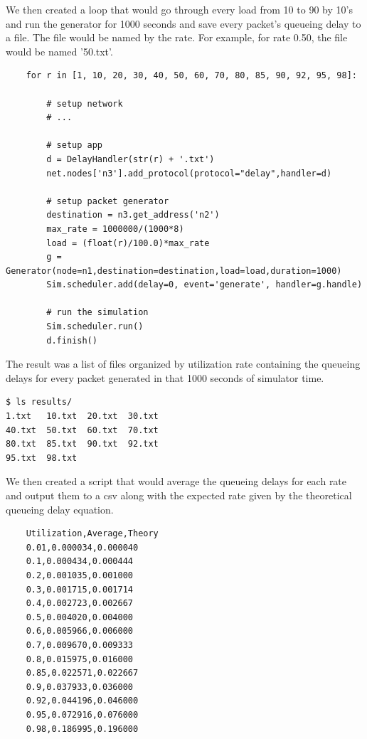 \documentclass[11pt]{article}
\begin{document}
\vspace{5mm}

We then created a loop that would go through every load from 10 to 90 by 10's and run the generator for 1000 seconds and save every packet's queueing delay to a file. The file would be named by the rate. For example, for rate 0.50, the file would be named '50.txt'.

\vspace{5mm}

\begin{lstlisting}
    for r in [1, 10, 20, 30, 40, 50, 60, 70, 80, 85, 90, 92, 95, 98]:

        # setup network
        # ...

        # setup app
        d = DelayHandler(str(r) + '.txt')
        net.nodes['n3'].add_protocol(protocol="delay",handler=d)

        # setup packet generator
        destination = n3.get_address('n2')
        max_rate = 1000000/(1000*8)
        load = (float(r)/100.0)*max_rate
        g = Generator(node=n1,destination=destination,load=load,duration=1000)
        Sim.scheduler.add(delay=0, event='generate', handler=g.handle)
        
        # run the simulation
        Sim.scheduler.run()
        d.finish()
\end{lstlisting}

\vspace{5mm}

The result was a list of files organized by utilization rate containing the queueing delays for every packet generated in that 1000 seconds of simulator time.

\vspace{5mm}

\begin{lstlisting}
$ ls results/
1.txt   10.txt  20.txt  30.txt  
40.txt  50.txt  60.txt  70.txt  
80.txt  85.txt  90.txt  92.txt  
95.txt  98.txt
\end{lstlisting}

\vspace{5mm}

We then created a script that would average the queueing delays for each rate and output them to a csv along with the expected rate given by the theoretical queueing delay equation.

\vspace{5mm}

\begin{lstlisting}
    Utilization,Average,Theory
    0.01,0.000034,0.000040
    0.1,0.000434,0.000444
    0.2,0.001035,0.001000
    0.3,0.001715,0.001714
    0.4,0.002723,0.002667
    0.5,0.004020,0.004000
    0.6,0.005966,0.006000
    0.7,0.009670,0.009333
    0.8,0.015975,0.016000
    0.85,0.022571,0.022667
    0.9,0.037933,0.036000
    0.92,0.044196,0.046000
    0.95,0.072916,0.076000
    0.98,0.186995,0.196000
\end{lstlisting}
\end{document}
